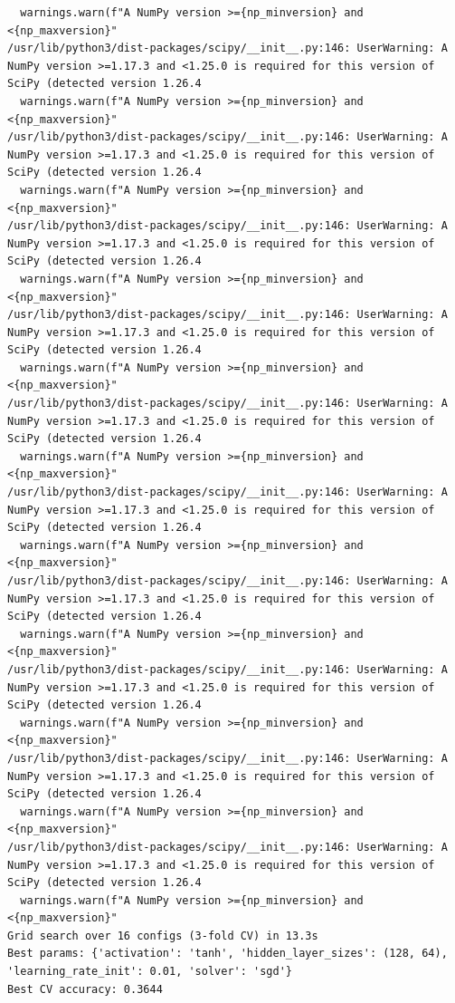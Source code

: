 \documentclass[11pt]{article}
\begin{document}
\begin{verbatim}
  warnings.warn(f"A NumPy version >={np_minversion} and <{np_maxversion}"
/usr/lib/python3/dist-packages/scipy/__init__.py:146: UserWarning: A NumPy version >=1.17.3 and <1.25.0 is required for this version of SciPy (detected version 1.26.4
  warnings.warn(f"A NumPy version >={np_minversion} and <{np_maxversion}"
/usr/lib/python3/dist-packages/scipy/__init__.py:146: UserWarning: A NumPy version >=1.17.3 and <1.25.0 is required for this version of SciPy (detected version 1.26.4
  warnings.warn(f"A NumPy version >={np_minversion} and <{np_maxversion}"
/usr/lib/python3/dist-packages/scipy/__init__.py:146: UserWarning: A NumPy version >=1.17.3 and <1.25.0 is required for this version of SciPy (detected version 1.26.4
  warnings.warn(f"A NumPy version >={np_minversion} and <{np_maxversion}"
/usr/lib/python3/dist-packages/scipy/__init__.py:146: UserWarning: A NumPy version >=1.17.3 and <1.25.0 is required for this version of SciPy (detected version 1.26.4
  warnings.warn(f"A NumPy version >={np_minversion} and <{np_maxversion}"
/usr/lib/python3/dist-packages/scipy/__init__.py:146: UserWarning: A NumPy version >=1.17.3 and <1.25.0 is required for this version of SciPy (detected version 1.26.4
  warnings.warn(f"A NumPy version >={np_minversion} and <{np_maxversion}"
/usr/lib/python3/dist-packages/scipy/__init__.py:146: UserWarning: A NumPy version >=1.17.3 and <1.25.0 is required for this version of SciPy (detected version 1.26.4
  warnings.warn(f"A NumPy version >={np_minversion} and <{np_maxversion}"
/usr/lib/python3/dist-packages/scipy/__init__.py:146: UserWarning: A NumPy version >=1.17.3 and <1.25.0 is required for this version of SciPy (detected version 1.26.4
  warnings.warn(f"A NumPy version >={np_minversion} and <{np_maxversion}"
/usr/lib/python3/dist-packages/scipy/__init__.py:146: UserWarning: A NumPy version >=1.17.3 and <1.25.0 is required for this version of SciPy (detected version 1.26.4
  warnings.warn(f"A NumPy version >={np_minversion} and <{np_maxversion}"
/usr/lib/python3/dist-packages/scipy/__init__.py:146: UserWarning: A NumPy version >=1.17.3 and <1.25.0 is required for this version of SciPy (detected version 1.26.4
  warnings.warn(f"A NumPy version >={np_minversion} and <{np_maxversion}"
/usr/lib/python3/dist-packages/scipy/__init__.py:146: UserWarning: A NumPy version >=1.17.3 and <1.25.0 is required for this version of SciPy (detected version 1.26.4
  warnings.warn(f"A NumPy version >={np_minversion} and <{np_maxversion}"
Grid search over 16 configs (3-fold CV) in 13.3s
Best params: {'activation': 'tanh', 'hidden_layer_sizes': (128, 64), 'learning_rate_init': 0.01, 'solver': 'sgd'}
Best CV accuracy: 0.3644
\end{verbatim}
\end{document}
